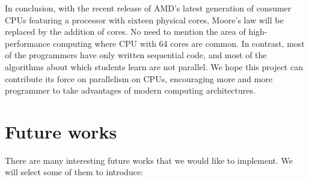 In conclusion, with the recent release of AMD's latest generation of consumer CPUs featuring a processor with sixteen physical cores, Moore's law will be replaced by the addition of cores. No need to mention the area of high-performance computing where CPU with 64 cores are common. In contrast, most of the programmers have only written sequential code, and most of the algorithms about which students learn are not parallel. We hope this project can contribute its force on parallelism on CPUs, encouraging more and more programmer to take advantages of modern computing architectures.
\section{Future works}
There are many interesting future works that we would like to implement. We will select some of them to introduce:
